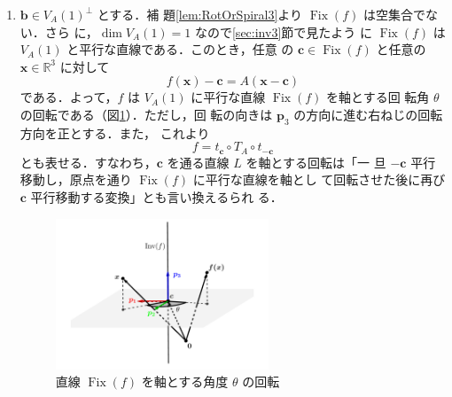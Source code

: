\documentclass[11pt, uplatex, dvipdfmx, titlepage]{jsarticle}
\makeatletter
\DeclareMathOperator{\Fix}{Fix}
\renewenvironment{proof}[1][\proofname]{\par
  \pushQED{\qed}%
  \normalfont \topsep6\p@\@plus6\p@\relax
  \trivlist
  \item[\hskip\labelsep
         \bfseries
    {#1}]\ignorespaces
}{%
  \popQED\endtrivlist\@endpefalse
}
\theoremstyle{definition}
\renewcommand{\proofname}{\textbf{証明}}
\makeatother
\begin{document}
\begin{proof}[定理\ref{thm:RotOrSpiral3}の証明]

  \begin{enumerate}[(1)]
  \item $\bm{b} \in V_A(1)^{\perp}$ とする．補
    題\ref{lem:RotOrSpiral3}より $\Fix(f)$ は空集合でない．さら
    に，$\dim V_A(1)=1$ なので\ref{sec:inv3}節で見たよう
    に $\Fix(f)$ は $V_A(1)$ と平行な直線である．このとき，任意
    の $\bm{c} \in \Fix(f)$ と任意の $\bm{x} \in \mathbb{R}^3$ に対して
    \[
      f(\bm{x}) - \bm{c} = A(\bm{x}-\bm{c})
    \]
    である．よって，$f$ は $V_A(1)$ に平行な直線 $\Fix(f)$ を軸とする回
    転角 $\theta$ の回転である（図\ref{fig:rotation3gen}）．ただし，回
    転の向きは $\bm{p}_3$ の方向に進む右ねじの回転方向を正とする．また，
    これより
    \[
      f= t_{\bm{c}} \circ T_A \circ t_{-\bm{c}} 
    \]
    とも表せる．すなわち，$\bm{c}$ を通る直線 $L$ を軸とする回転は「一
    旦 $-\bm{c}$ 平行移動し，原点を通り $\Fix(f)$ に平行な直線を軸とし
    て回転させた後に再び $\bm{c}$ 平行移動する変換」とも言い換えるられ
    る．
    \begin{figure}[h]
      \centering
      \includegraphics[height=4.5cm]{pictures/rotation3gen.pdf}
           \caption{直線 $\Fix(f)$ を軸とする角度 $\theta$ の回転}
      \label{fig:rotation3gen}
    \end{figure}


\end{enumerate}
\end{proof}
\end{document}
